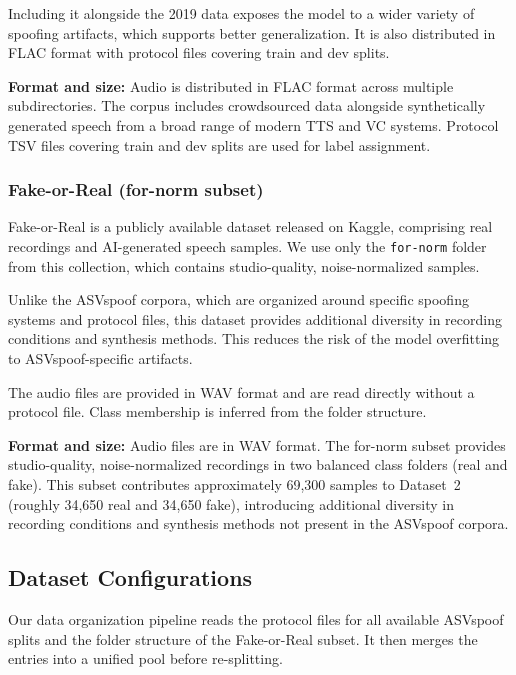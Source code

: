 \documentclass[11pt,a4paper]{article}
\begin{document}
Including it alongside the 2019 data exposes the model to a wider variety of
spoofing artifacts, which supports better generalization. It is also distributed
in FLAC format with protocol files covering train and dev splits.

\textbf{Format and size:} Audio is distributed in FLAC format across multiple
subdirectories. The corpus includes crowdsourced data alongside synthetically
generated speech from a broad range of modern TTS and VC systems. Protocol TSV
files covering train and dev splits are used for label assignment.

\subsubsection{Fake-or-Real (for-norm subset)}

Fake-or-Real \cite{abdeldayem2024fakeorreal} is a publicly available dataset
released on Kaggle, comprising real recordings and AI-generated speech samples.
We use only the \texttt{for-norm} folder from this collection, which contains
studio-quality, noise-normalized samples.

Unlike the ASVspoof corpora, which are organized around specific spoofing systems
and protocol files, this dataset provides additional diversity in recording
conditions and synthesis methods. This reduces the risk of the model overfitting
to ASVspoof-specific artifacts.

The audio files are provided in WAV format and are read directly without a
protocol file. Class membership is inferred from the folder structure.

\textbf{Format and size:} Audio files are in WAV format. The for-norm subset
provides studio-quality, noise-normalized recordings in two balanced class folders
(real and fake). This subset contributes approximately 69,300 samples to Dataset~2
(roughly 34,650 real and 34,650 fake), introducing additional diversity in
recording conditions and synthesis methods not present in the ASVspoof corpora.

\subsection{Dataset Configurations}

Our data organization pipeline reads the protocol files for all available ASVspoof
splits and the folder structure of the Fake-or-Real subset. It then merges the
entries into a unified pool before re-splitting.
\end{document}

